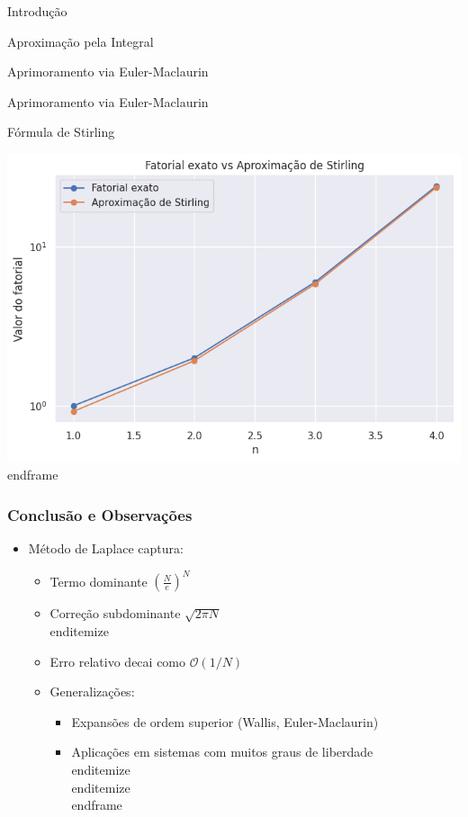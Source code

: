 \documentclass[11pt]{beamer}
\begin{document}
\begin{frame}
\begin{frame}
\begin{itemize}
\begin{frame}{Introdução}
\begin{itemize}
\begin{frame}{Aproximação pela Integral}
\begin{itemize}
\begin{frame}{Aprimoramento via Euler-Maclaurin}
\begin{itemize}
\begin{frame}{Aprimoramento via Euler-Maclaurin}
\begin{itemize}
\begin{frame}{Fórmula de Stirling}
\begin{itemize}
\begin{frame}
\begin{itemize}
\begin{frame}
\begin{itemize}
\begin{frame}
\begin{frame}
\begin{itemize}
\begin{frame}
\begin{itemize}
\begin{frame}
\begin{itemize}
\begin{frame}
\begin{itemize}
\begin{frame}
  \includegraphics[scale=0.5]{stirling.png}
\\end{frame}
\begin{frame}
\frametitle{Conclusão e Observações}
\begin{itemize}
\item Método de Laplace captura: 
\begin{itemize}
\item Termo dominante \( \left( \frac{N}{e} \right)^N \)
\item Correção subdominante \( \sqrt{2\pi N} \)
\\end{itemize}

\item Erro relativo decai como \( \mathcal{O}(1/N) \)
\item Generalizações:
\begin{itemize}
\item Expansões de ordem superior (Wallis, Euler-Maclaurin)
\item Aplicações em sistemas com muitos graus de liberdade
\\end{itemize}
\\end{itemize}
\\end{frame}




\end{itemize}
\end{itemize}
\end{itemize}
\end{frame}
\end{frame}
\end{itemize}
\end{frame}
\end{itemize}
\end{frame}
\end{itemize}
\end{frame}
\end{itemize}
\end{frame}
\end{frame}
\end{itemize}
\end{frame}
\end{itemize}
\end{frame}
\end{itemize}
\end{frame}
\end{itemize}
\end{frame}
\end{itemize}
\end{frame}
\end{itemize}
\end{frame}
\end{itemize}
\end{frame}
\end{itemize}
\end{frame}
\end{frame}
\end{document}
